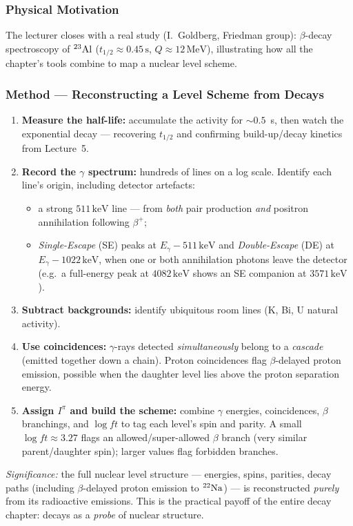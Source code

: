 \subsubsection*{Physical Motivation}
The lecturer closes with a real study (I.~Goldberg, Friedman group): $\beta$-decay
spectroscopy of $\nucleus{Al}{23}$ ($t_{1/2}\approx 0.45\,\text{s}$,
$Q\approx12\,\text{MeV}$), illustrating how all the chapter's tools combine to map
a nuclear level scheme.

\subsubsection*{Method --- Reconstructing a Level Scheme from Decays}
\begin{enumerate}[label=\arabic*.,nosep]
  \item \textbf{Measure the half-life:} accumulate the activity for $\sim0.5$~s,
        then watch the exponential decay --- recovering $t_{1/2}$ and confirming
        build-up/decay kinetics from Lecture~5.
  \item \textbf{Record the $\gamma$ spectrum:} hundreds of lines on a log scale.
        Identify each line's origin, including detector artefacts:
        \begin{itemize}[nosep]
          \item a strong $511\,\text{keV}$ line --- from \emph{both} pair
                production \emph{and} positron annihilation following $\beta^+$;
          \item \emph{Single-Escape} (SE) peaks at $E_\gamma-511\,\text{keV}$ and
                \emph{Double-Escape} (DE) at $E_\gamma-1022\,\text{keV}$, when one
                or both annihilation photons leave the detector
                (e.g.\ a full-energy peak at $4082\,\text{keV}$ shows an SE
                companion at $3571\,\text{keV}$).
        \end{itemize}
  \item \textbf{Subtract backgrounds:} identify ubiquitous room lines (K, Bi, U
        natural activity).
  \item \textbf{Use coincidences:} $\gamma$-rays detected \emph{simultaneously}
        belong to a \emph{cascade} (emitted together down a chain). Proton
        coincidences flag $\beta$-delayed proton emission, possible when the
        daughter level lies above the proton separation energy.
  \item \textbf{Assign $I^\pi$ and build the scheme:} combine $\gamma$ energies,
        coincidences, $\beta$ branchings, and $\log ft$ to tag each level's spin
        and parity. A small $\log ft\approx3.27$ flags an allowed/super-allowed
        $\beta$ branch (very similar parent/daughter spin); larger values flag
        forbidden branches.
\end{enumerate}
\textit{Significance:} the full nuclear level structure --- energies, spins,
parities, decay paths (including $\beta$-delayed proton emission to
$\nucleus{Na}{22}$) --- is reconstructed \emph{purely} from its radioactive
emissions. This is the practical payoff of the entire decay chapter: decays as a
\emph{probe} of nuclear structure.

